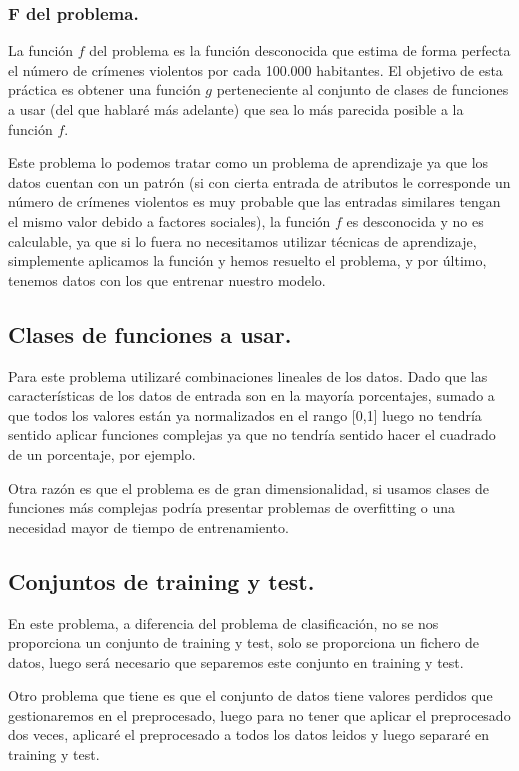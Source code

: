 \documentclass[12pt, spanish]{article}
\begin{document}
\subsubsection{F del problema.}

La función $f$ del problema es la función desconocida que estima de forma perfecta el número de crímenes violentos por cada 100.000 habitantes. El objetivo de esta práctica es obtener una función $g$ perteneciente al conjunto de clases de funciones a usar (del que hablaré más adelante) que sea lo más parecida posible a la función $f$.

Este problema lo podemos tratar como un problema de aprendizaje ya que los datos cuentan con un patrón (si con cierta entrada de atributos le corresponde un número de crímenes violentos es muy probable que las entradas similares tengan el mismo valor debido a factores sociales), la función $f$ es desconocida y no es calculable, ya que si lo fuera no necesitamos utilizar técnicas de aprendizaje, simplemente aplicamos la función y hemos resuelto el problema, y por último, tenemos datos con los que entrenar nuestro modelo.

\subsection{Clases de funciones a usar.}

Para este problema utilizaré combinaciones lineales de los datos. Dado que las características de los datos de entrada son en la mayoría porcentajes, sumado a que todos los valores están ya normalizados en el rango [0,1] luego no tendría sentido aplicar funciones complejas ya que no tendría sentido hacer el cuadrado de un porcentaje, por ejemplo.

Otra razón es que el problema es de gran dimensionalidad, si usamos clases de funciones más complejas podría presentar problemas de overfitting o una necesidad mayor de tiempo de entrenamiento.

\subsection{Conjuntos de training y test.}

En este problema, a diferencia del problema de clasificación, no se nos proporciona un conjunto de training y test, solo se proporciona un fichero de datos, luego será necesario que separemos este conjunto en training y test. 

Otro problema que tiene es que el conjunto de datos tiene valores perdidos que gestionaremos en el preprocesado, luego para no tener que aplicar el preprocesado dos veces, aplicaré el preprocesado a todos los datos leidos y luego separaré en training y test.
\end{document}
